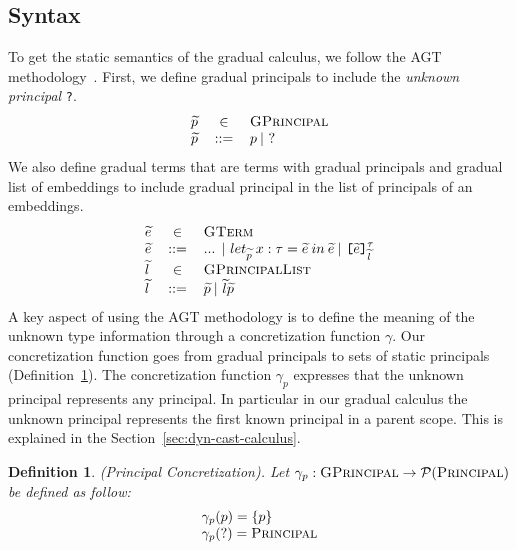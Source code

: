 \documentclass{article}
\newcommand{\emb}[3]{\texttt{[}#1\texttt{]}_{#2}^{#3}}
\newcommand\icode[1]{\texttt{#1}}
\newcommand\powerset[1]{\mathcal P(#1)}
\newcommand\wt[1]{\widetilde{#1}}
\newtheorem{definition}{Definition}[section]
\begin{document}
\subsection{Syntax}
To get the static semantics of the gradual calculus, we follow the AGT methodology~\cite{garciaAl:popl2016}. First, we define gradual principals to include the \emph{unknown principal} \icode{?}.
\[
\begin{tabular}{l c l}
$\wt{p}$ & $\in$ &  \textsc{GPrincipal} \\
$\wt{p}$ & $::=$ &  $p \: |$  $ ? $\\		
\end{tabular}
\]
We also define gradual terms that are terms with gradual principals and gradual list of embeddings to include gradual principal in the list of principals of an embeddings.   
\[	
\begin{tabular}{l c l}		 
		$\wt{e}$ & $\in$  & $\textsc{GTerm}$\\
		 $\wt{e}$ & $::=$ &  ... $|$ $let_{\wt{p}} \: x : \tau = \wt{e} \: in \: \wt{e} \: |$  $ \emb{\wt{e}}{\wt{l}}{\tau}$\\
			$\wt{l}$ & $\in$  & $\textsc{GPrincipalList}$\\
			$ \wt{l} $ & $::=$ & $ \wt{p} \: |$  $ \wt{l}\wt{p} $ \\ 	
\end{tabular}
\]	
A key aspect of using the AGT methodology is to define the meaning of the unknown type information through a concretization function $\gamma$. Our concretization function goes from gradual principals to sets of static principals (Definition~\ref{def:principal_concretization}). The concretization function $\gamma_p$ expresses that the unknown principal represents any principal. In particular in our gradual calculus the unknown principal represents the first known principal in a parent scope. This is explained in the Section~\ref{sec:dyn-cast-calculus}.
\begin{definition}(Principal Concretization). Let $\gamma_p : \textsc{GPrincipal} \rightarrow \powerset{\textsc{Principal}}$ be defined as follow:
\label{def:principal_concretization}
\[
	\begin{tabular}{l}		
	$\gamma_p(p) = \left\{p \right\}$ \\
	$\gamma_p(?) = \textsc{Principal}$ \\	
	\end{tabular}
	\]	
\end{definition}
	
\end{document}

